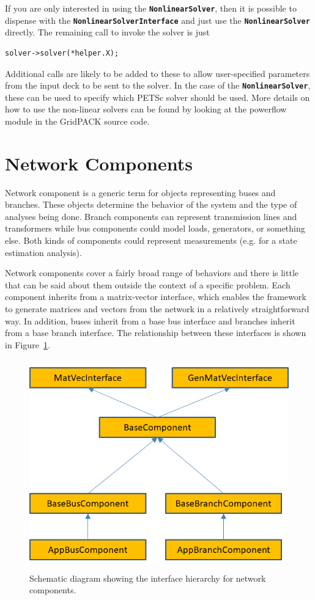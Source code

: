 \documentclass[12pt]{report} %
\begin{document}
If you are only interested in using the \texttt{\textbf{NonlinearSolver}}, then it is possible to dispense with the \texttt{\textbf{NonlinearSolverInterface}} and just use the \texttt{\textbf{NonlinearSolver}} directly. The remaining call to invoke the solver is just

{
\color{red}
\begin{Verbatim}[fontseries=b]
  solver->solver(*helper.X);
\end{Verbatim}
}

Additional calls are likely to be added to these to allow user-specified parameters from the input deck to be sent to the solver. In the case of the \texttt{\textbf{NonlinearSolver}}, these can be used to specify which PETSc solver should be used.
More details on how to use the non-linear solvers can be found by looking at the powerflow module in the GridPACK source code.

\section{Network Components}

Network component is a generic term for objects representing buses and branches. These objects determine the behavior of the system and the type of analyses being done. Branch components can represent transmission lines and transformers while bus components could model loads, generators, or something else. Both kinds of components could represent measurements (e.g. for a state estimation analysis). 

Network components cover a fairly broad range of behaviors and there is little that can be said about them outside the context of a specific problem. Each component inherits from a matrix-vector interface, which enables the framework to generate matrices and vectors from the network in a relatively straightforward way. In addition, buses inherit from a base bus interface and branches inherit from a base branch interface. The relationship between these interfaces is shown in Figure~\ref{fig:fig-5}.

\begin{figure}
  \centering
  \includegraphics*[width=6in, height=3.58in, keepaspectratio=true]{Fig5-heirarchy}
  \caption{Schematic diagram showing the interface hierarchy for network components.}
  \label{fig:fig-5}
\end{figure}
\end{document}
